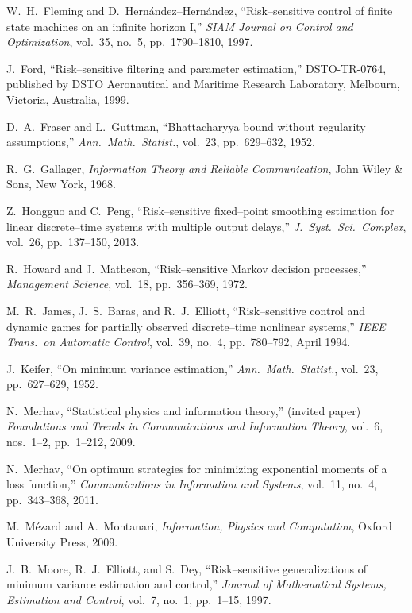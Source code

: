 \documentclass[11pt,epsf]{article}
\begin{document}
\begin{thebibliography}{AA}
W.~H.~Fleming and D.~Hern\'andez--Hern\'andez, ``Risk--sensitive control of
finite state machines on an infinite horizon I,''
{\it SIAM Journal on Control and
Optimization}, vol.\ 35, no.\ 5, pp.\ 1790--1810, 1997.

J.~Ford, ``Risk--sensitive filtering and parameter estimation,''
DSTO-TR-0764, published by DSTO Aeronautical and Maritime Research Laboratory,
Melbourn, Victoria, Australia, 1999.

D.~A.~Fraser and L.~Guttman, ``Bhattacharyya bound without regularity
assumptions,'' {\it Ann.\ Math.\ Statist.}, vol.\ 23, pp.\ 629--632, 1952.

R.~G.~Gallager, {\it Information Theory and Reliable Communication}, John
Wiley \& Sons, New York, 1968.

Z.~Hongguo and C.~Peng, ``Risk--sensitive fixed--point smoothing estimation
for linear discrete--time systems with multiple output delays,'' {\it
J.~Syst.\ Sci.\ Complex}, vol.\ 26, pp.\ 137--150, 2013.

R.~Howard and J.~Matheson, ``Risk--sensitive Markov decision processes,''
{\it Management Science}, vol.\ 18, pp.\ 356--369, 1972.

M.~R.~James, J.~S.~Baras, and R.~J.~Elliott, ``Risk--sensitive control and
dynamic games for partially observed discrete--time nonlinear systems,''
{\it IEEE Trans.\ on Automatic Control}, vol.\ 39, no.\ 4, pp.\ 780--792,
April 1994.

J.~Keifer, ``On minimum variance estimation,'' {\it Ann.\ Math.\ Statist.},
vol.\ 23, pp.\ 627--629, 1952.

N.~Merhav, ``Statistical physics and information theory,''
(invited paper) {\it Foundations and Trends in
Communications and Information Theory}, vol.\ 6, nos.\ 1--2, pp.\ 1--212,
2009.

N.~Merhav, ``On optimum strategies for minimizing exponential moments of
a loss function,''
{\it Communications in Information and Systems},
vol.\ 11, no.\ 4, pp.\ 343--368, 2011.

M.~M\'ezard and
A.~Montanari, {\it Information, Physics and Computation},
Oxford University Press, 2009.

J.~B.~Moore, R.~J.~Elliott, and S.~Dey, ``Risk--sensitive generalizations of
minimum variance estimation and control,'' {\it Journal of Mathematical
Systems, Estimation and Control}, vol.\ 7, no.\ 1, pp.\ 1--15, 1997.


\end{thebibliography}
\end{document}

